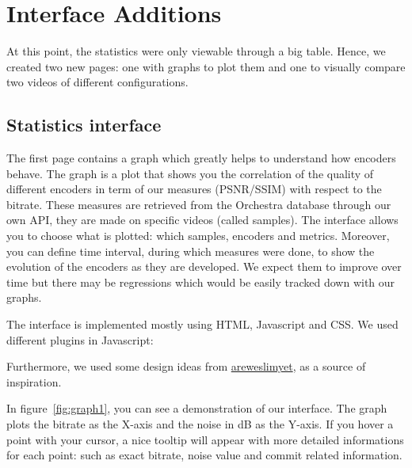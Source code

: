 \documentclass[a4paper,12pt]{article}
\begin{document}
\section{Interface Additions}
At this point, the statistics were only viewable through a big table.  Hence, we
created two new pages: one with graphs to plot them and one to visually compare
two videos of different configurations.

\subsection{Statistics interface}
The first page contains a graph which greatly helps to understand how encoders
behave.  The graph is a plot that shows you the correlation of the quality of
different encoders in term of our measures (PSNR/SSIM) with respect to the
bitrate.  These measures are retrieved from the Orchestra database through our
own API, they are made on specific videos (called samples).  The interface
allows you to choose what is plotted: which samples, encoders and metrics.
Moreover, you can define time interval, during which measures were done, to show
the evolution of the encoders as they are developed.  We expect them to improve
over time but there may be regressions which would be easily tracked down with
our graphs.

The interface is implemented mostly using HTML, Javascript and CSS.  We used
different plugins in Javascript:
Furthermore, we used some design ideas from
\href{http://areweslimyet.com}{areweslimyet}, as a source of inspiration.

In figure~\ref{fig:graph1}, you can see a demonstration of our interface.  The
graph plots the bitrate as the X-axis and the noise in dB as the Y-axis.  If you
hover a point with your cursor, a nice tooltip will appear with more detailed
informations for each point: such as exact bitrate, noise value and commit
related information.
\end{document}
